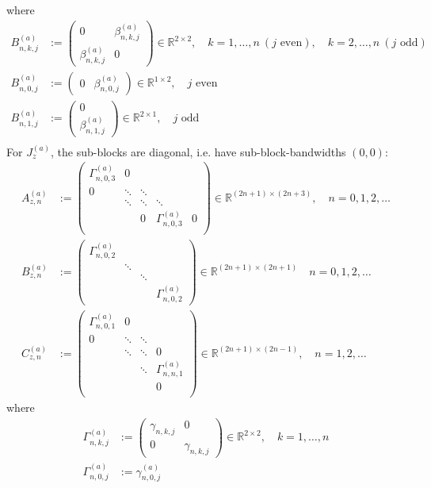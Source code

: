 \documentclass[11pt, oneside]{article}   	%
\newcommand{\R}{\mathbb{R}}
\newcommand{\betaa}{\beta^{(a)}}
\newcommand{\gammaa}{\gamma^{(a)}}
\begin{document}
where
\begin{align*}
	B^{(a)}_{n,k,j} &:= 
		\begin{pmatrix}
			0 & \betaa_{n,k,j} \\
			\betaa_{n,k,j} & 0
		\end{pmatrix} \in \R^{2\times2}, \quad k = 1,\dots,n \: (j \text{ even}), \quad k = 2,\dots,n \: (j \text{ odd}) \\
	B^{(a)}_{n,0,j} &:=
		\begin{pmatrix}
			0 & \betaa_{n,0,j}
		\end{pmatrix} \in \R^{1\times2}, \quad j \text{ even} \\
	B^{(a)}_{n,1,j} &:=
		\begin{pmatrix}
			0 \\
			\betaa_{n,1,j}
		\end{pmatrix} \in \R^{2\times1}, \quad j \text{ odd} \\
\end{align*}
For $J_z^{(a)}$, the sub-blocks are diagonal, i.e. have sub-block-bandwidths $(0,0)$:
\begin{align*}
	A^{(a)}_{z,n} &:= 
		\begin{pmatrix}
			\Gamma^{(a)}_{n,0,3} & 0 & \\
			0 & \ddots & \ddots & & \\
			& \ddots & \ddots & \ddots & \\
			& & 0 & \Gamma^{(a)}_{n,0,3} & 0 \\
		\end{pmatrix} \in \R^{(2n+1)\times(2n+3)}, \quad n = 0,1,2,\dots \\
	B^{(a)}_{z,n} &:= 
		\begin{pmatrix}
			\Gamma^{(a)}_{n,0,2} & \\
			& \ddots & & \\
			& & \ddots & \\
			& & & \Gamma^{(a)}_{n,0,2}
		\end{pmatrix} \in \R^{(2n+1)\times(2n+1)}  \quad n = 0,1,2,\dots \\
	C^{(a)}_{z,n} &:= 
		\begin{pmatrix}
			\Gamma^{(a)}_{n,0,1} & 0 & & \\
			0 & \ddots & \ddots & \\
			& \ddots & \ddots & 0 \\
			& & \ddots & \Gamma^{(a)}_{n,n,1} \\
			& & & 0 \\
		\end{pmatrix} \in \R^{(2n+1)\times(2n-1)}, \quad n = 1,2,\dots
\end{align*}
where
\begin{align*}
	\Gamma^{(a)}_{n,k,j} &:= 
		\begin{pmatrix}
			\gamma_{n,k,j} & 0 \\
			0 & \gamma_{n,k,j}
		\end{pmatrix} \in \R^{2\times2}, \quad k = 1,\dots,n \\
	\Gamma^{(a)}_{n,0,j} &:= \gammaa_{n,0,j}
\end{align*}
\end{document}
